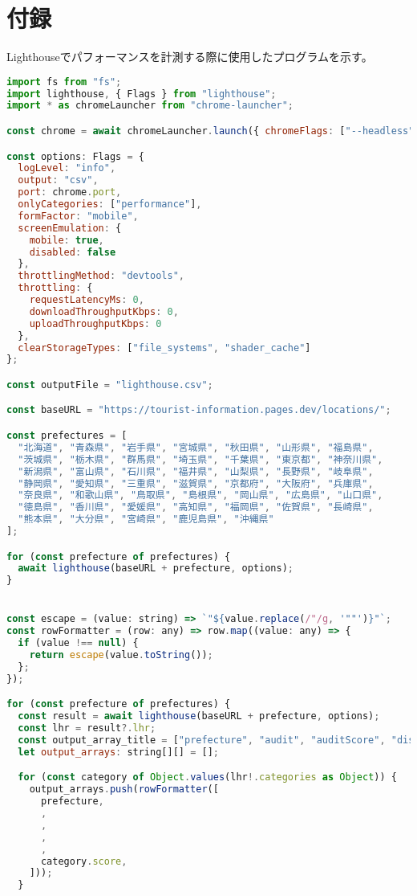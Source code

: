 \section*{付録}
Lighthouseでパフォーマンスを計測する際に使用したプログラムを示す。
\begin{lstlisting}[language=JavaScript]
import fs from "fs";
import lighthouse, { Flags } from "lighthouse";
import * as chromeLauncher from "chrome-launcher";

const chrome = await chromeLauncher.launch({ chromeFlags: ["--headless"] });

const options: Flags = {
  logLevel: "info",
  output: "csv",
  port: chrome.port,
  onlyCategories: ["performance"],
  formFactor: "mobile",
  screenEmulation: {
    mobile: true,
    disabled: false
  },
  throttlingMethod: "devtools",
  throttling: {
    requestLatencyMs: 0,
    downloadThroughputKbps: 0,
    uploadThroughputKbps: 0
  },
  clearStorageTypes: ["file_systems", "shader_cache"]
};

const outputFile = "lighthouse.csv";

const baseURL = "https://tourist-information.pages.dev/locations/";

const prefectures = [
  "北海道", "青森県", "岩手県", "宮城県", "秋田県", "山形県", "福島県",
  "茨城県", "栃木県", "群馬県", "埼玉県", "千葉県", "東京都", "神奈川県",
  "新潟県", "富山県", "石川県", "福井県", "山梨県", "長野県", "岐阜県",
  "静岡県", "愛知県", "三重県", "滋賀県", "京都府", "大阪府", "兵庫県",
  "奈良県", "和歌山県", "鳥取県", "島根県", "岡山県", "広島県", "山口県",
  "徳島県", "香川県", "愛媛県", "高知県", "福岡県", "佐賀県", "長崎県",
  "熊本県", "大分県", "宮崎県", "鹿児島県", "沖縄県"
];

for (const prefecture of prefectures) {
  await lighthouse(baseURL + prefecture, options);
}


const escape = (value: string) => `"${value.replace(/"/g, '""')}"`;
const rowFormatter = (row: any) => row.map((value: any) => {
  if (value !== null) {
    return escape(value.toString());
  };
});

for (const prefecture of prefectures) {
  const result = await lighthouse(baseURL + prefecture, options);
  const lhr = result?.lhr;
  const output_array_title = ["prefecture", "audit", "auditScore", "displayValue", "description", "categoryScore"];
  let output_arrays: string[][] = [];

  for (const category of Object.values(lhr!.categories as Object)) {
    output_arrays.push(rowFormatter([
      prefecture,
      ,
      ,
      ,
      ,
      category.score,
    ]));
  }


\end{lstlisting}
